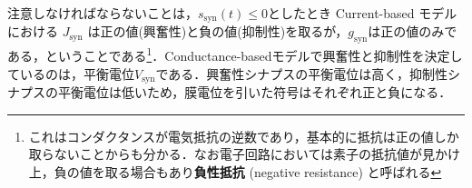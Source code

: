 注意しなければならないことは，$s_{\text{syn}}(t)\leq 0$としたとき Current-based モデルにおける $J_{\text{syn}}$ は正の値(興奮性)と負の値(抑制性)を取るが，$g_{\text{syn}}$は正の値のみである，ということである\footnote{これはコンダクタンスが電気抵抗の逆数であり，基本的に抵抗は正の値しか取らないことからも分かる．なお電子回路においては素子の抵抗値が見かけ上，負の値を取る場合もあり\textbf{負性抵抗} (negative resistance) と呼ばれる}．Conductance-basedモデルで興奮性と抑制性を決定しているのは，平衡電位$V_{\text{syn}}$である．興奮性シナプスの平衡電位は高く，抑制性シナプスの平衡電位は低いため，膜電位を引いた符号はそれぞれ正と負になる．
